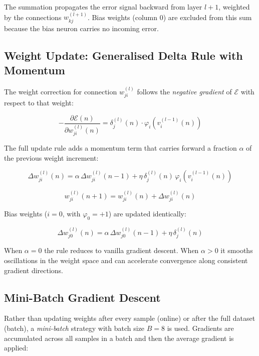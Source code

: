 \documentclass{acm_proc_article-sp}
\begin{document}
The summation propagates the error signal backward from layer $l+1$,
weighted by the connections $w^{(l+1)}_{kj}$.  Bias weights (column 0)
are excluded from this sum because the bias neuron carries no incoming
error.

\subsection{Weight Update: Generalised Delta Rule with Momentum}

The weight correction for connection $w^{(l)}_{ji}$ follows the
\textit{negative gradient} of $\mathcal{E}$ with respect to that weight:

\begin{equation}
  -\frac{\partial\mathcal{E}(n)}{\partial w^{(l)}_{ji}(n)}
  = \delta^{(l)}_j(n) \cdot \varphi_i\!\left(v^{(l-1)}_i(n)\right)
\end{equation}

The full update rule adds a momentum term that carries forward a
fraction $\alpha$ of the previous weight increment:

\begin{equation}
  \Delta w^{(l)}_{ji}(n)
  = \alpha\,\Delta w^{(l)}_{ji}(n-1)
  + \eta\,\delta^{(l)}_j(n)\,\varphi_i\!\left(v^{(l-1)}_i(n)\right)
  \label{eq:dw}
\end{equation}

\begin{equation}
  w^{(l)}_{ji}(n+1) = w^{(l)}_{ji}(n) + \Delta w^{(l)}_{ji}(n)
  \label{eq:w_update}
\end{equation}

Bias weights ($i=0$, with $\varphi_0 = +1$) are updated identically:

\begin{equation}
  \Delta w^{(l)}_{j0}(n)
  = \alpha\,\Delta w^{(l)}_{j0}(n-1)
  + \eta\,\delta^{(l)}_j(n)
\end{equation}

When $\alpha = 0$ the rule reduces to vanilla gradient descent.  When
$\alpha > 0$ it smooths oscillations in the weight space and can
accelerate convergence along consistent gradient directions.

\subsection{Mini-Batch Gradient Descent}

Rather than updating weights after every sample (online) or after the
full dataset (batch), a \textit{mini-batch} strategy with batch size
$B = 8$ is used.  Gradients are accumulated across all samples in a
batch and then the average gradient is applied:
\end{document}
